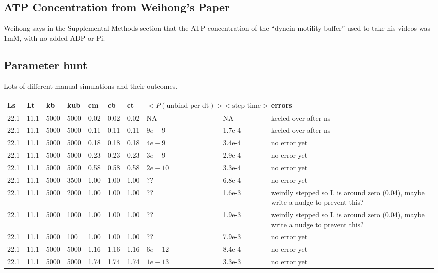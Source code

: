 \documentclass[10pt]{article} %
\begin{document}
\subsection{ATP Concentration from Weihong's Paper}
Weihong says in the Supplemental Methods section that the ATP concentration of the ``dynein motility buffer'' used to take his videos was 1mM, with no added ADP or Pi.\\

\subsection{Parameter hunt}
Lots of different manual simulations and their outcomes.

\begin{center}
  \begin{tabular}{| l | l | l | l | l | l | l | p{3cm} | p{2cm} | p{5cm} |}
    \hline
    Ls & Lt & kb & kub & cm & cb & ct & $\Big<P(\mbox{unbind per dt})\Big>$ & $\Big<\mbox{step time}\Big>$ & errors\\\hline
    22.1 & 11.1 & 5000 & 5000 & 0.02 & 0.02 & 0.02 & NA      & NA     & keeled over after ns\\\hline
    22.1 & 11.1 & 5000 & 5000 & 0.11 & 0.11 & 0.11 & $9e-9 $ & 1.7e-4 & keeled over after ns\\\hline
    22.1 & 11.1 & 5000 & 5000 & 0.18 & 0.18 & 0.18 & $4e-9 $ & 3.4e-4 & no error yet\\\hline
    22.1 & 11.1 & 5000 & 5000 & 0.23 & 0.23 & 0.23 & $3e-9 $ & 2.9e-4 & no error yet\\\hline
    22.1 & 11.1 & 5000 & 5000 & 0.58 & 0.58 & 0.58 & $2e-10$ & 3.3e-4 & no error yet\\\hline
    22.1 & 11.1 & 5000 & 3500 & 1.00 & 1.00 & 1.00 & ?? & 6.8e-4 & no error yet\\\hline
    22.1 & 11.1 & 5000 & 2000 & 1.00 & 1.00 & 1.00 & ?? & 1.6e-3 & weirdly stepped so L is around zero (0.04), maybe write a nudge to prevent this?\\\hline
    22.1 & 11.1 & 5000 & 1000 & 1.00 & 1.00 & 1.00 & ?? & 1.9e-3 & weirdly stepped so L is around zero (0.04), maybe write a nudge to prevent this?\\\hline
    22.1 & 11.1 & 5000 &  100 & 1.00 & 1.00 & 1.00 & ?? & 7.9e-3 & no error yet\\\hline
    22.1 & 11.1 & 5000 & 5000 & 1.16 & 1.16 & 1.16 & $6e-12$ & 8.4e-4 & no error yet\\\hline
    22.1 & 11.1 & 5000 & 5000 & 1.74 & 1.74 & 1.74 & $1e-13$ & 3.3e-3 & no error yet\\\hline

\end{tabular}
\end{center}
\end{document}
